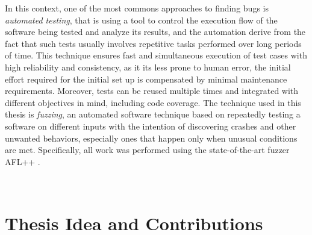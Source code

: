 In this context, one of the most commons approaches to finding bugs is \textit{automated testing}, that is using a tool to control the execution flow of the software being tested and analyze its results, and the automation derive from the fact that such tests usually involves repetitive tasks performed over long periods of time. This technique ensures fast and simultaneous execution of test cases with high reliability and consistency, as it its less prone to human error, the initial effort required for the initial set up is compensated by minimal maintenance requirements. Moreover, tests can be reused multiple times and integrated with different objectives in mind, including code coverage.
\newline
The technique used in this thesis is \textit{fuzzing}, an automated software technique based on repeatedly testing a software on different inputs with the intention of discovering crashes and other unwanted behaviors, especially ones that happen only when unusual conditions are met.
\newline
{}
Specifically, all work was performed using the state-of-the-art fuzzer AFL++ \cite{AFL}.




\ \\
\section{Thesis Idea and Contributions}




